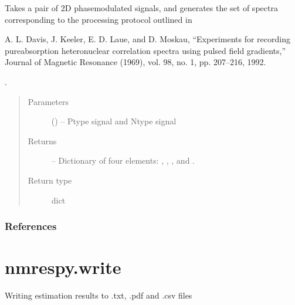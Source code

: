 \documentclass[letterpaper,10pt,english]{sphinxmanual}
\begin{document}
\begin{fulllineitems}
\label{\detokenize{references/sig:nmrespy.sig.proc_phase_modulated}}
\sphinxAtStartPar
Takes a pair of 2D phase\sphinxhyphen{}modulated signals, and generates the
set of spectra corresponding to the processing protocol outlined in %
\begin{footnote}[2]\sphinxAtStartFootnote
A. L. Davis, J. Keeler, E. D. Laue, and D. Moskau, “Experiments for
recording pure\sphinxhyphen{}absorption heteronuclear correlation spectra using
pulsed field gradients,” Journal of Magnetic Resonance (1969),
vol. 98, no. 1, pp. 207–216, 1992.
%
\end{footnote}.
\begin{quote}\begin{description}
\item[{Parameters}] \leavevmode
\sphinxAtStartPar
{} (\sphinxstyleliteralemphasis{\sphinxupquote{{[}}}\sphinxstyleliteralemphasis{\sphinxupquote{, }}\sphinxstyleliteralemphasis{\sphinxupquote{{]}}}) – P\sphinxhyphen{}type signal and N\sphinxhyphen{}type signal

\item[{Returns}] \leavevmode
\sphinxAtStartPar
{} – Dictionary of four elements: , , , and .

\item[{Return type}] \leavevmode
\sphinxAtStartPar
dict

\end{description}\end{quote}
\subsubsection*{References}

\end{fulllineitems}





\section{nmrespy.write}
\label{\detokenize{references/write:module-nmrespy.write}}\label{\detokenize{references/write:nmrespy-write}}\label{\detokenize{references/write::doc}}
\sphinxAtStartPar
Writing estimation results to .txt, .pdf and .csv files
\end{document}
